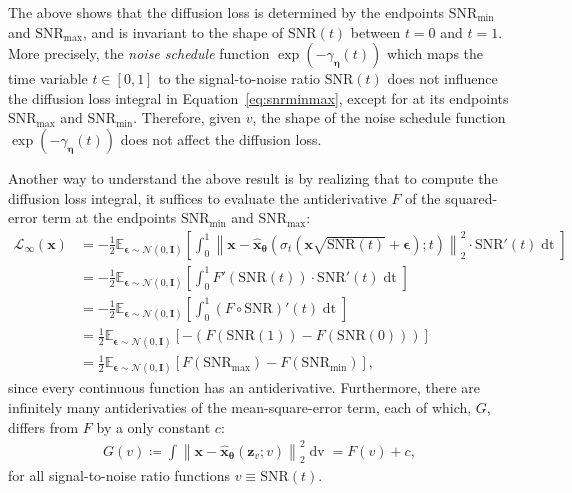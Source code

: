 The above shows that the diffusion loss is determined by the endpoints $\mathrm{SNR}_{\mathrm{min}}$ and $\mathrm{SNR}_{\mathrm{max}}$, and is invariant to the shape of $\mathrm{SNR}(t)$ between $t=0$ and $t=1$. More precisely, the \textit{noise schedule} function $\exp(-\gamma_{\boldsymbol{\eta}}(t))$ which maps the time variable $t \in [0,1]$ to the signal-to-noise ratio $\mathrm{SNR}(t)$ does not influence the diffusion loss integral in Equation~\ref{eq:snrminmax}, except for at its endpoints $\mathrm{SNR}_{\mathrm{max}}$ and $\mathrm{SNR}_{\mathrm{min}}$. Therefore, given $v$, the shape of the noise schedule function $\exp(-\gamma_{\boldsymbol{\eta}}(t))$ does not affect the diffusion loss.

Another way to understand the above result is by realizing that to compute the diffusion loss integral, it suffices to evaluate the antiderivative $F$ of the squared-error term at the endpoints $\mathrm{SNR}_{\mathrm{min}}$ and $\mathrm{SNR}_{\mathrm{max}}$:
%
\begin{align}
    \mathcal{L}_\infty(\mathbf{x}) & = -\frac{1} {2}\mathbb{E}_{\boldsymbol{\epsilon} \sim \mathcal{N}(0,\mathbf{I})}\left[\int_0^1\left\| \mathbf{x} - \hat{\mathbf{x}}_{\boldsymbol{\theta}}\left( \sigma_t\left(\mathbf{x}\sqrt{\mathrm{SNR}(t)} + \boldsymbol{\epsilon}\right) ;t\right) \right\|^2_2 \cdot \mathrm{SNR}'(t)\mathop{\mathrm{d}t}\right] 
    \\[5pt] & = -\frac{1} {2}\mathbb{E}_{\boldsymbol{\epsilon} \sim \mathcal{N}(0,\mathbf{I})}\left[\int_0^1 F'(\mathrm{SNR}(t)) \cdot \mathrm{SNR}'(t)\mathop{\mathrm{d}t} \right] 
    \\[5pt] & = -\frac{1} {2}\mathbb{E}_{\boldsymbol{\epsilon} \sim \mathcal{N}(0,\mathbf{I})}\left[\int_0^1 (F \circ \mathrm{SNR})' (t) \mathop{\mathrm{d}t} \right] 
    \\[5pt] & = \frac{1} {2}\mathbb{E}_{\boldsymbol{\epsilon} \sim \mathcal{N}(0,\mathbf{I})}\left[ -\left(F(\mathrm{SNR}(1)) - F(\mathrm{SNR}(0))\right) \right]
    \\[5pt] & = \frac{1} {2}\mathbb{E}_{\boldsymbol{\epsilon} \sim \mathcal{N}(0,\mathbf{I})}\left[ F(\mathrm{SNR}_\mathrm{max}) - F(\mathrm{SNR}_\mathrm{min}) \right],
\end{align}
%
since every continuous function has an antiderivative. Furthermore, there are infinitely many antiderivaties of the mean-square-error term, each of which, $G$, differs from $F$ by a only constant $c$:
%
\begin{align}
    G(v) \coloneqq \int \left\| \mathbf{x} - \hat{\mathbf{x}}_{\boldsymbol{\theta}}\left( \mathbf{z}_v;v\right) \right\|^2_2 \mathop{\mathrm{d}v} = F(v) + c,
\end{align}
%
for all signal-to-noise ratio functions $v \equiv \mathrm{SNR}(t)$.

